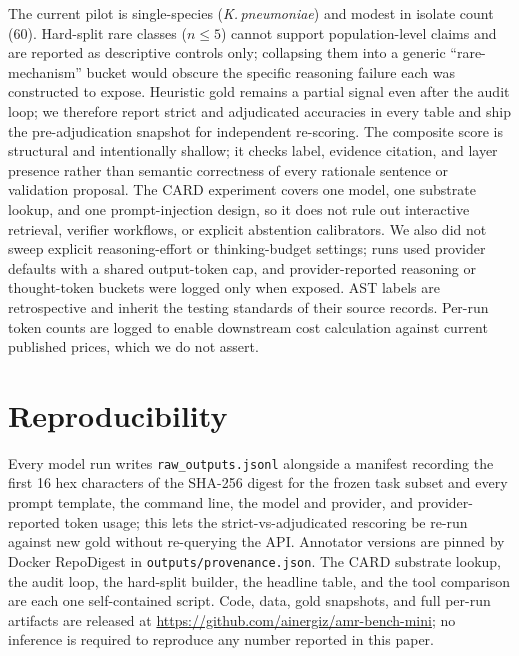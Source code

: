 \documentclass{article}
\begin{document}
The current pilot is single-species (\emph{K.\,pneumoniae}) and modest in
isolate count (60). Hard-split rare classes ($n \leq 5$) cannot support
population-level claims and are reported as descriptive controls only;
collapsing them into a generic ``rare-mechanism'' bucket would obscure the
specific reasoning failure each was constructed to expose. Heuristic gold
remains a partial signal even after the audit loop; we therefore report
strict and adjudicated accuracies in every table and ship the
pre-adjudication snapshot for independent re-scoring. The composite score is
structural and intentionally shallow; it checks label, evidence citation, and
layer presence rather than semantic correctness of every rationale sentence or
validation proposal. The CARD experiment covers one model, one substrate
lookup, and one prompt-injection design, so it does not rule out interactive
retrieval, verifier workflows, or explicit abstention calibrators. We also did
not sweep explicit reasoning-effort or thinking-budget settings; runs used
provider defaults with a shared output-token cap, and provider-reported
reasoning or thought-token buckets were logged only when exposed. AST labels are
retrospective and inherit the testing standards of their source records. Per-run
token counts are logged to enable downstream cost calculation against current
published prices, which we do not assert.

\section{Reproducibility}

Every model run writes \texttt{raw\_outputs.jsonl} alongside a manifest
recording the first 16 hex characters of the SHA-256 digest for the frozen
task subset and every prompt template, the command line, the model and provider, and provider-reported
token usage; this lets the strict-vs-adjudicated rescoring be re-run against
new gold without re-querying the API. Annotator versions are pinned by
Docker RepoDigest in \texttt{outputs/provenance.json}. The CARD substrate
lookup, the audit loop, the hard-split builder, the headline table, and the
tool comparison are each one self-contained script. Code, data, gold
snapshots, and full per-run artifacts are released at
\url{https://github.com/ainergiz/amr-bench-mini}; no inference is required to
reproduce any number reported in this paper.



\end{document}
